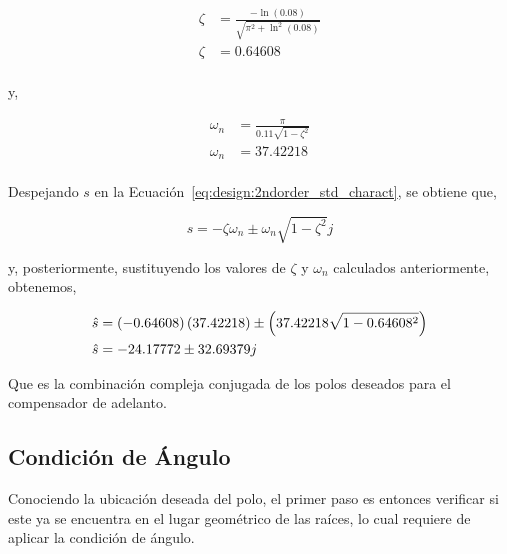 \documentclass[12pt,a4paper]{article}
\begin{document}
        \begin{equation*}
          \begin{aligned}
            \zeta &= \frac{-\ln\left(0.08\right)}{\sqrt{\pi^{2} + \ln^{2}\left(0.08\right)}} \\
            \zeta &= 0.64608 \\
          \end{aligned}
        \end{equation*}

        y, 

        \begin{equation*}
          \begin{aligned}
            \omega_{n} &= \frac{\pi}{0.11\sqrt{1-\zeta^{2}}} \\ 
            \omega_{n} &= 37.42218 \\
          \end{aligned}
        \end{equation*}
        
        Despejando \( s \) en la Ecuación~\ref{eq:design:2ndorder_std_charact}, se obtiene que, 

        \begin{equation}
          s = -\zeta\omega_{n} \pm \omega_{n}\sqrt{1 - \zeta^{2}}j
          \label{eq:design:charact_sval}
        \end{equation}

        y, posteriormente, sustituyendo los valores de \( \zeta \)  y \( \omega_{n} \) calculados anteriormente, 
        obtenemos,

        \begin{equation}
          \centering
          \begin{aligned}
            \hat{s} &= \left(-0.64608\right) \left(37.42218\right) \pm \left(37.42218\sqrt{1-0.64608^{2}}\right) \\
            \hat{s} &= -24.17772 \pm 32.69379j
          \end{aligned}
        \end{equation}

        Que es la combinación compleja conjugada de los polos deseados para el compensador de adelanto. 

      \subsection{Condición de Ángulo}

        Conociendo la ubicación deseada del polo, el primer paso es entonces verificar si este ya se encuentra en 
        el lugar geométrico de las raíces, lo cual requiere de aplicar la condición de ángulo. 
\end{document}
